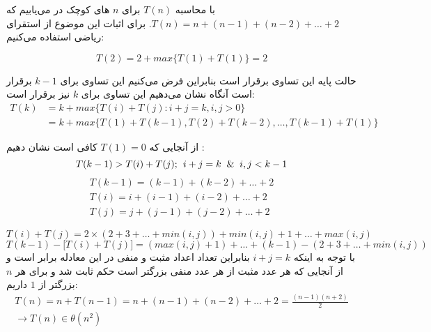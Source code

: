 \documentclass[]{article}
\begin{document}
با محاسبه $T(n)$ برای $n$ های کوچک
در می‌یابیم که $T(n) = n + (n-1) + (n-2) + \dots + 2$.
برای اثبات این موضوع از استقرای ریاضی استفاده می‌کنیم:

$$T(2) = 2 + max \lbrace T(1) + T(1)\rbrace = 2$$

حالت پایه این تساوی برقرار است بنابراین فرض می‌کنیم این تساوی برای $k-1$
برقرار است آنگاه نشان می‌دهیم این تساوی برای $k$ نیز برقرار است:
\begin{equation}
\begin{split}
T(k) & = k + max \lbrace T(i) + T(j) : i + j = k, i,j > 0 \rbrace
\\ & = k + max \lbrace T(1) + T(k-1), T(2) + T(k-2), \dots, T(k-1) + T(1) \rbrace
\end{split}
\end{equation}

از آنجایی که $T(1) = 0$
کافی است نشان دهیم :
$$T(k-1) > T(i) + T(j) ; \hspace{0.15cm} i+j = k \And i,j < k-1$$
\begin{equation}
\begin{split}        
    T(k-1) = (k-1) + (k-2) + \dots + 2 \\
    T(i)= i + (i-1) + (i-2) + \dots + 2 \\
    T(j) = j + (j-1) + (j-2) + \dots + 2
\end{split}
\end{equation}

\begin{equation}
    T(i) + T(j) = 2 \times ( 2 + 3 + \dots + min(i, j)) + min(i,j) + 1 + \dots + max(i,j)
\end{equation}
\begin{equation}
    T(k-1) - \lbrack T(i) + T(j) \rbrack = (max(i,j) + 1) + \dots + (k - 1)- (2 + 3 + \dots + min(i, j))
\end{equation}
با توجه به اینکه $i + j = k$
بنابراین تعداد اعداد مثبت و منفی در این معادله برابر است و از آنجایی که هر عدد مثبت از هر
عدد منفی بزرگتر است حکم ثابت شد و برای هر $n$ بزرگتر از $1$
داریم:
\begin{equation}
    \begin{split}
        T(n) = n + T(n-1) = n + (n-1) + (n-2) + \dots + 2 = \frac{(n-1)(n+2)}{2}
        \\ \rightarrow T(n) \in \theta(n^2)
    \end{split}
\end{equation}
\end{document}
